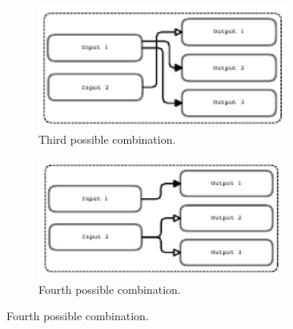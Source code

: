 \documentclass[../../thesis.tex]{subfiles}
\begin{document}
\begin{figure}
     \begin{subfigure}{0.45\textwidth}
        \centering
        \includegraphics[width=0.9\textwidth]{content/unveiling/img/input-problem-3}         \caption{Third possible combination.}
    \end{subfigure}\hfill
    \begin{subfigure}{0.45\textwidth}
        \centering
        \includegraphics[width=0.9\textwidth]{content/unveiling/img/input-problem-4}         \caption{Fourth possible combination.}
    \end{subfigure}
    

\end{figure}
\end{document}
